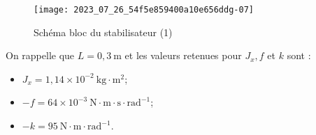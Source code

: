 \begin{figure}[!h]
\centering
\texttt{[image: 2023\_07\_26\_54f5e859400a10e656ddg-07]}
\caption{\label{fig_ccspsi2022:10}Schéma bloc du stabilisateur (1)}
\end{figure}

On rappelle que $L=0,3 \mathrm{~m}$ et les valeurs retenues pour $J_{x}, f$ et $k$ sont :

\begin{itemize}
  \item $J_{x}=1,14 \times 10^{-2} \mathrm{~kg} \cdot \mathrm{m}^{2}$;

  \item $-f=64 \times 10^{-3} \mathrm{~N} \cdot \mathrm{m} \cdot \mathrm{s} \cdot \mathrm{rad}^{-1}$;

  \item $-k=95 \mathrm{~N} \cdot \mathrm{m} \cdot \mathrm{rad}^{-1}$.
\end{itemize}

